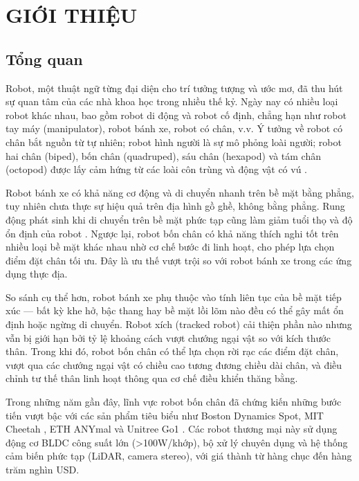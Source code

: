 \chapter{GIỚI THIỆU}

\section{Tổng quan}

Robot, một thuật ngữ từng đại diện cho trí tưởng tượng và ước mơ, đã thu hút sự quan tâm của các nhà khoa học trong nhiều thế kỷ. Ngày nay có nhiều loại robot khác nhau, bao gồm robot di động và robot cố định, chẳng hạn như robot tay máy (manipulator), robot bánh xe, robot có chân, v.v. Ý tưởng về robot có chân bắt nguồn từ tự nhiên; robot hình người là sự mô phỏng loài người; robot hai chân (biped), bốn chân (quadruped), sáu chân (hexapod) và tám chân (octopod) được lấy cảm hứng từ các loài côn trùng và động vật có vú \cite{raibert1986}.

Robot bánh xe có khả năng cơ động và di chuyển nhanh trên bề mặt bằng phẳng, tuy nhiên chưa thực sự hiệu quả trên địa hình gồ ghề, không bằng phẳng. Rung động phát sinh khi di chuyển trên bề mặt phức tạp cũng làm giảm tuổi thọ và độ ổn định của robot \cite{gonzalez2018}. Ngược lại, robot bốn chân có khả năng thích nghi tốt trên nhiều loại bề mặt khác nhau nhờ cơ chế bước đi linh hoạt, cho phép lựa chọn điểm đặt chân tối ưu. Đây là ưu thế vượt trội so với robot bánh xe trong các ứng dụng thực địa.

So sánh cụ thể hơn, robot bánh xe phụ thuộc vào tính liên tục của bề mặt tiếp xúc --- bất kỳ khe hở, bậc thang hay bề mặt lồi lõm nào đều có thể gây mất ổn định hoặc ngừng di chuyển. Robot xích (tracked robot) cải thiện phần nào nhưng vẫn bị giới hạn bởi tỷ lệ khoảng cách vượt chướng ngại vật so với kích thước thân. Trong khi đó, robot bốn chân có thể lựa chọn rời rạc các điểm đặt chân, vượt qua các chướng ngại vật có chiều cao tương đương chiều dài chân, và điều chỉnh tư thế thân linh hoạt thông qua cơ chế điều khiển thăng bằng.

Trong những năm gần đây, lĩnh vực robot bốn chân đã chứng kiến những bước tiến vượt bậc với các sản phẩm tiêu biểu như Boston Dynamics Spot, MIT Cheetah \cite{hyun2014, bledt2018}, ETH ANYmal \cite{hutter2016} và Unitree Go1 \cite{unitree2021}. Các robot thương mại này sử dụng động cơ BLDC công suất lớn (>100W/khớp), bộ xử lý chuyên dụng và hệ thống cảm biến phức tạp (LiDAR, camera stereo), với giá thành từ hàng chục đến hàng trăm nghìn USD.

